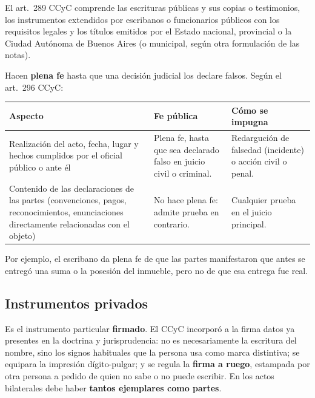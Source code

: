 \documentclass[12pt,oneside]{book}
\renewcommand{\arraystretch}{1.15}
\begin{document}
El art.~289 CCyC comprende las escrituras públicas y sus copias o testimonios, los instrumentos extendidos por escribanos o funcionarios públicos con los requisitos legales y los títulos emitidos por el Estado nacional, provincial o la Ciudad Autónoma de Buenos Aires (o municipal, según otra formulación de las notas). %

Hacen \textbf{plena fe} hasta que una decisión judicial los declare falsos. Según el art.~296 CCyC:

\begin{table}[H]
\centering
\renewcommand{\arraystretch}{1.25}
\begin{tabularx}{\textwidth}{>{\RaggedRight\arraybackslash}p{}>{\RaggedRight\arraybackslash}X>{\RaggedRight\arraybackslash}X}
\toprule
\textbf{Aspecto} & \textbf{Fe pública} & \textbf{Cómo se impugna} \\
\midrule
Realización del acto, fecha, lugar y hechos cumplidos por el oficial público o ante él & Plena fe, hasta que sea declarado falso en juicio civil o criminal. & Redargución de falsedad (incidente) o acción civil o penal. \\
\addlinespace
Contenido de las declaraciones de las partes (convenciones, pagos, reconocimientos, enunciaciones directamente relacionadas con el objeto) & No hace plena fe: admite prueba en contrario. & Cualquier prueba en el juicio principal. \\
\bottomrule
\end{tabularx}
\end{table}

Por ejemplo, el escribano da plena fe de que las partes manifestaron que antes se entregó una suma o la posesión del inmueble, pero no de que esa entrega fue real.

\subsection{Instrumentos privados}

Es el instrumento particular \textbf{firmado}. El CCyC incorporó a la firma datos ya presentes en la doctrina y jurisprudencia: no es necesariamente la escritura del nombre, sino los signos habituales que la persona usa como marca distintiva; se equipara la impresión dígito-pulgar; y se regula la \textbf{firma a ruego}, estampada por otra persona a pedido de quien no sabe o no puede escribir. En los actos bilaterales debe haber \textbf{tantos ejemplares como partes}.
\end{document}
